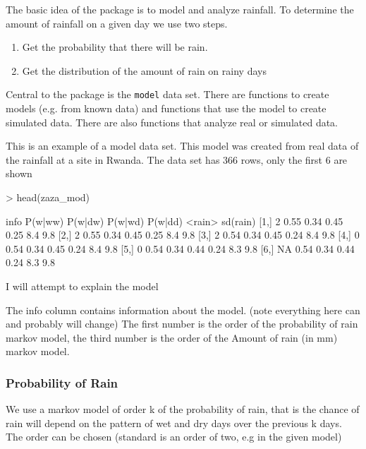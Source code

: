 \documentclass{article}
\begin{document}
The basic idea of the package is to model
and analyze rainfall.
To determine the amount of rainfall on a given day
we use two steps.



\begin{enumerate}
\item  Get the probability that there will be rain.
\item  Get the distribution of the amount of rain on rainy days
\end{enumerate}

Central to the package is the {\tt model} data set.  
There are functions to create models (e.g. from known data)
and functions that use the model to create simulated
data.  There are also functions that analyze real or simulated
data.

This is an example of a model data set.   This
model was created from real data of the rainfall at
a site in Rwanda. The data set has 366 rows,
only the first 6 are shown

\begin{Schunk}
\begin{Sinput}
> head(zaza_mod)
\end{Sinput}
\begin{Soutput}
     info P(w|ww) P(w|dw) P(w|wd) P(w|dd) <rain> sd(rain)
[1,]    2    0.55    0.34    0.45    0.25    8.4      9.8
[2,]    2    0.55    0.34    0.45    0.25    8.4      9.8
[3,]    2    0.54    0.34    0.45    0.24    8.4      9.8
[4,]    0    0.54    0.34    0.45    0.24    8.4      9.8
[5,]    0    0.54    0.34    0.44    0.24    8.3      9.8
[6,]   NA    0.54    0.34    0.44    0.24    8.3      9.8
\end{Soutput}
\end{Schunk}

I will attempt to explain the model

The info column contains information about the model.
(note everything here can and probably will change)
The first number is the order of the probability
of rain markov model, the third number is the order
of the Amount of rain (in mm) markov model.



\subsubsection{Probability of Rain}

We use a markov model of order k of the probability of rain, that is the chance
of rain will depend on the pattern of wet and dry days over the
previous k days. The order can be chosen (standard is an order of two,
e.g in the given model)
\end{document}
